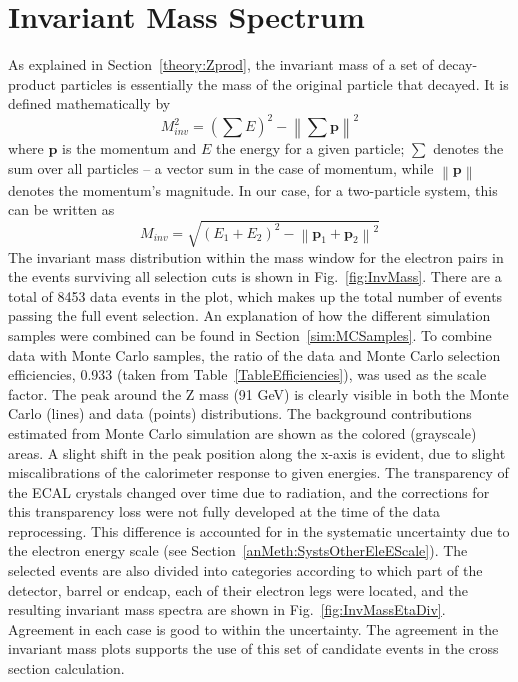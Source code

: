 \section{Invariant Mass Spectrum} %
\label{anMeth:invmass}
As explained in Section~\ref{theory:Zprod}, %
the invariant mass of a set of decay-product particles is 
essentially the mass of the original particle that decayed. 
It is defined mathematically by %
\[
M_{inv}^2 = \left( \sum E \right)^2 - \left\| \sum \mathbf{p} \right\|^2
\]
where $ \mathbf{p} $ is the momentum 
and $ E $ the energy for a given particle; 
$ \sum $ denotes the sum over all particles 
-- a vector sum in the case of momentum, 
while $\left\| \mathbf{p} \right\|$ denotes the momentum's magnitude.  
In our case, for a two-particle system, this can be written as 
\[
M_{inv} = \sqrt{ \left(E_1 + E_2\right)^2 - \left\|\mathbf{p}_1 + \mathbf{p}_2\right\|^2 }
\]
The invariant mass distribution within the mass window 
for the electron pairs 
in the events surviving all selection cuts is shown in 
Fig.~\ref{fig:InvMass}.  
There are a total of 8453 data events in the plot, 
which makes up the total number of events passing 
the full event selection.  
An explanation of how the different simulation 
samples were combined can be 
found in Section~\ref{sim:MCSamples}.  
To combine data with Monte Carlo samples, 
the ratio of the data and Monte Carlo selection efficiencies, 
0.933 (taken from Table~\ref{TableEfficiencies}), 
was used as the scale factor.  
The peak around the Z mass (91 GeV) is clearly visible 
in both the Monte Carlo (lines) and data (points) distributions.  
The background contributions estimated from Monte Carlo simulation 
are shown as the colored (grayscale) areas.  
A slight shift in the peak position along the x-axis is 
evident, due to slight miscalibrations of 
the calorimeter response to given energies.  
The transparency of the ECAL crystals changed over time 
due to radiation, 
and the corrections for this transparency loss 
were not fully developed at the time of the 
data reprocessing.  %
This difference is accounted for in the 
systematic uncertainty due to the electron energy scale 
(see Section~\ref{anMeth:SystsOtherEleEScale}).  
The selected events are also divided into categories according 
to which part of the detector, barrel or endcap, 
each of their electron legs were located, 
and the resulting invariant mass spectra are 
shown in Fig.~\ref{fig:InvMassEtaDiv}.  
Agreement in each case is good to within the 
uncertainty.  
The agreement in the invariant mass plots supports 
the use of this set of candidate events in 
the cross section calculation.  

